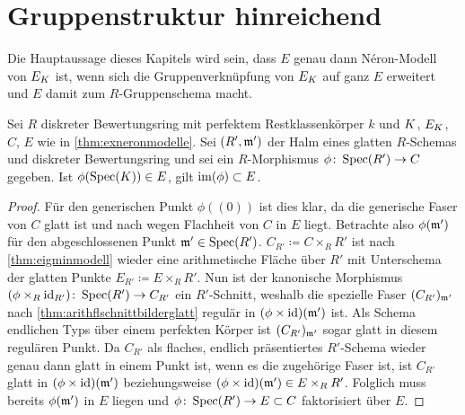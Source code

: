 \section{Gruppenstruktur hinreichend}\label{chap:gruppenstrukturhinreichend}
Die Hauptaussage dieses Kapitels wird sein, dass $E$ genau dann
Néron-Modell von $E_{K}$ ist, wenn sich die Gruppenverknüpfung von
$E_{K}$ auf ganz $E$ erweitert und $E$ damit zum $R$-Gruppenschema
macht.
\begin{Lemma}\label{thm:schnittearithmflglatt}
  Sei $R$ diskreter Bewertungsring mit perfektem Restklassenkörper
  $k$ und $K$, $E_{K}$, $C$, $E$ wie in \ref{thm:exneronmodelle}.
  Sei $(R',\mathfrak{m}')$ der Halm eines glatten $R$-Schemas und diskreter
  Bewertungsring
  und sei ein $R$-Morphismus ${\phi\colon \operatorname{Spec}(R')\to C}$ gegeben.
  Ist ${\phi(\operatorname{Spec}(K))\in E}$, gilt ${\operatorname{im}(\phi)\subset E}$.
  \begin{proof}
    Für den generischen Punkt $\phi((0))$ ist dies klar, da die
    generische Faser von $C$ glatt ist und nach
    \cite[Proposition~8.5/17]{bosch} wegen Flachheit von $C$ in $E$
    liegt. 
    Betrachte also $\phi(\mathfrak{m}')$ für den abgeschlossenen Punkt
    ${\mathfrak{m}'\in\operatorname{Spec}(R')}$.
    ${C_{R'}\coloneqq C\times_R R'}$ ist nach
    \ref{thm:eigminmodell} wieder eine arithmetische Fläche über
    $R'$ mit Unterschema der glatten Punkte
    ${E_{R'}\coloneqq E\times_R R'}$.
    Nun ist der kanonische Morphismus
    $(\phi\times_{R}\mathrm{id}_{R'})\colon\operatorname{Spec}(R')\to C_{R'}$ ein 
    $R'$-Schnitt, weshalb die spezielle Faser $(C_{R'})_{\mathfrak{m}'}$ nach
    \ref{thm:arithflschnittbilderglatt} regulär in
    $(\phi\times\mathrm{id})(\mathfrak{m}')$ ist.
    Als Schema endlichen Typs über einem
    perfekten Körper ist $(C_{R'})_{\mathfrak{m}'}$ sogar glatt in diesem
    regulären Punkt.
    Da $C_{R'}$ als flaches, endlich präsentiertes $R'$-Schema wieder
    genau dann glatt in einem Punkt ist, wenn es die zugehörige Faser
    ist, ist $C_{R'}$ glatt in $(\phi\times\mathrm{id})(\mathfrak{m}')$ beziehungsweise
    $(\phi\times\mathrm{id})(\mathfrak{m}')\in E\times_R R'$. Folglich muss bereits
    $\phi(\mathfrak{m}')$ in $E$ liegen und $\phi\colon \operatorname{Spec}(R')\to E\subset C$
    faktorisiert über $E$.
  \end{proof}
\end{Lemma}  

